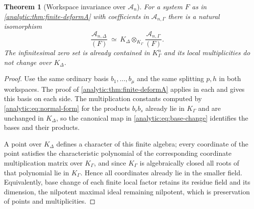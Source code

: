 \documentclass[11pt,letterpaper]{article}
\newtheorem{theorem}{Theorem}[section]
\theoremstyle{definition}
\theoremstyle{remark}
\newcommand{\A}{\mathscr A}
\numberwithin{equation}{section}
\begin{document}
\begin{theorem}[Workspace invariance over $\A_n$]
\label{analytic:thm:workspace}
For a system $F$ as in \cref{analytic:thm:finite-deformA} with coefficients
in $\A_{n,\Gamma}$ there is a natural isomorphism
\begin{equation}\label{analytic:eq:base-change}
 \frac{\A_{n,\Delta}}{(F)}\ \simeq\
 K_\Delta\otimes_{K_\Gamma}\frac{\A_{n,\Gamma}}{(F)} .
\end{equation}
The infinitesimal zero set is already contained in $K_\Gamma^n$ and its
local multiplicities do not change over $K_\Delta$.
\end{theorem}
\begin{proof}
Use the same ordinary basis $b_1,\ldots,b_\mu$ and the same splitting
$p,h$ in both workspaces. The proof of
\cref{analytic:thm:finite-deformA} applies in each and gives this basis on
each side. The multiplication constants computed by
\eqref{analytic:eq:normal-form} for the products $b_rb_s$ already lie in
$K_\Gamma$ and are unchanged in $K_\Delta$, so the canonical map in
\eqref{analytic:eq:base-change} identifies the bases and their products.

A point over $K_\Delta$ defines a character of this finite algebra; every
coordinate of the point satisfies the characteristic polynomial of the
corresponding coordinate multiplication matrix over $K_\Gamma$, and since
$K_\Gamma$ is algebraically closed all roots of that polynomial lie in
$K_\Gamma$. Hence all coordinates already lie in the smaller field.
Equivalently, base change of each finite local factor retains its residue
field and its dimension, the nilpotent maximal ideal remaining nilpotent,
which is preservation of points and multiplicities.
\end{proof}
\end{document}

